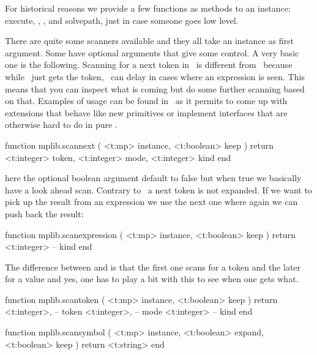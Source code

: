 \stopsection

\startsection[title=Methods]

For historical reasons we provide a few functions as methods to an instance: \typ
{execute}, , ,  and \typ
{solvepath}, just in case someone goes low level.

\stopsection

\startsection[title=Scanners]

There are quite some scanners available and they all take an instance as first
argument. Some have optional arguments that give some control. A very basic one
is the following. Scanning for a next token in \METAPOST\ is different from \TEX\
because while \TEX\ just gets the token, \METAPOST\ can delay in cases where an
expression is seen. This means that you can inspect what is coming but do some
further scanning based on that. Examples of usage can be found in \CONTEXT\ as it
permits to come up with extensions that behave like new primitives or implement
interfaces that are otherwise hard to do in pure \METAPOST.

\starttyping[option=LUA]
function mplib.scannext ( <t:mp> instance, <t:boolean> keep )
    return <t:integer> token, <t:integer> mode, <t:integer> kind
end
\stoptyping

here the optional  boolean argument default to false but when true we
basically have a look ahead scan. Contrary to \TEX\ a next token is not expanded. If we
want to pick up the result from an expression we use the next one where again we can
push back the result:

\startfourrows
\stopfourrows

\starttyping[option=LUA]
function mplib.scanexpression ( <t:mp> instance, <t:boolean> keep )
    return <t:integer> -- kind
end
\stoptyping

The difference between  and  is that the first one
scans for a token and the later for a value and yes, one has to play a bit with
this to see when one gets what.

\starttyping[option=LUA]
function mplib.scantoken ( <t:mp> instance, <t:boolean> keep )
    return
        <t:integer>, -- token
        <t:integer>, -- mode
        <t:integer>  -- kind
end
\stoptyping

\starttyping[option=LUA]
function mplib.scansymbol ( <t:mp> instance, <t:boolean> expand, <t:boolean> keep )
    return <t:string>
end
\stoptyping

